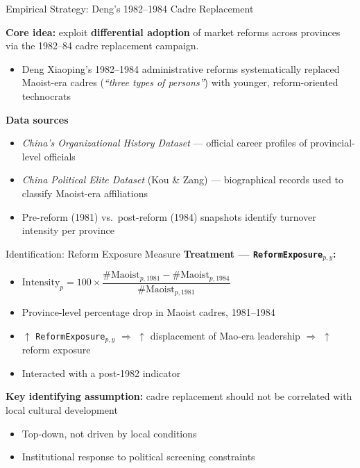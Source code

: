 \documentclass[aspectratio=169]{beamer}
\begin{document}
\begin{frame}{Empirical Strategy: Deng's 1982--1984 Cadre Replacement}

\textbf{Core idea:} exploit \textbf{differential adoption} of market reforms across provinces via the 1982–84 cadre replacement campaign.
\begin{itemize}
    \item Deng Xiaoping's 1982--1984 administrative reforms systematically replaced Maoist-era cadres (\textit{``three types of persons''}) with younger, reform-oriented technocrats
\end{itemize}
\vspace{0.4em}
  \textbf{Data sources}
  \begin{itemize}\small
    \item \textit{China's Organizational History Dataset} — official career profiles of provincial-level officials
    \item \textit{China Political Elite Dataset} (Kou \& Zang) — biographical records used to classify Maoist-era affiliations
    \item Pre-reform (1981) vs.\ post-reform (1984) snapshots identify turnover intensity per province
  \end{itemize}

\end{frame}

\begin{frame}{Identification: Reform Exposure Measure}
\textbf{Treatment — \texttt{ReformExposure}$_{p,y}$:}
\begin{itemize}
 \item $\text{Intensity}_p = 100\times\dfrac{\#\text{Maoist}_{p,1981} - \#\text{Maoist}_{p,1984}}{\#\text{Maoist}_{p,1981}}$
    \item Province-level percentage drop in Maoist cadres, 1981--1984
  \item $\uparrow$ \texttt{ReformExposure}$_{p,y}$ $\Rightarrow$ $\uparrow$ displacement of Mao-era leadership $\Rightarrow$ \alert{$\uparrow$ reform exposure}
  \item Interacted with a post-1982 indicator
\end{itemize}

\vspace{0.4em}
\textbf{Key identifying assumption:}
cadre replacement should not be correlated with local cultural development
\begin{itemize}
  \item Top-down, not driven by local conditions
  \item Institutional response to political screening constraints
\end{itemize}

\end{frame}
\end{document}
